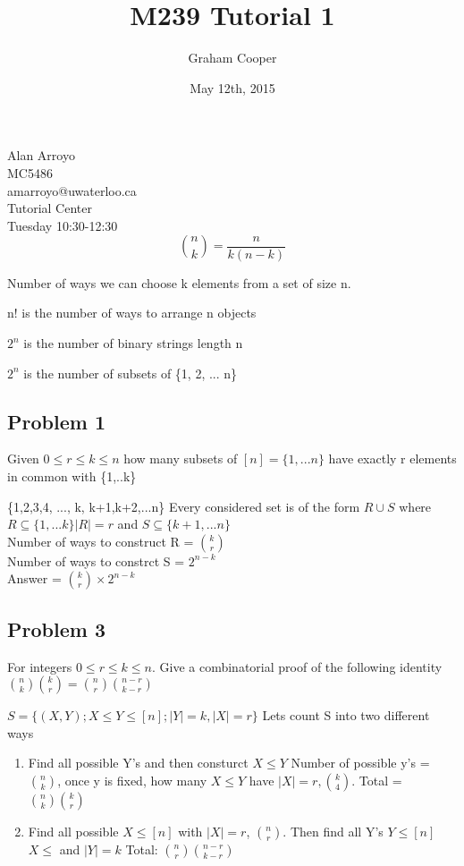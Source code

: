 \documentclass[12pt]{article}
\title{\vspace{-15ex}M239 Tutorial 1\vspace{-1ex}}
\date{May 12th, 2015}
\author{Graham Cooper}
\begin{document}
	\maketitle
	
	Alan Arroyo\\
	MC5486\\
	amarroyo@uwaterloo.ca\\
	Tutorial Center\\
	Tuesday 10:30-12:30\\
	
	$${n \choose k} = \frac{n\!}{k\!(n-k)\!}$$
	
	Number of ways we can choose k elements from a set of size n.
	
	n! is the number of ways to arrange n objects
	
	$2^n$ is the number of binary strings length n
	
	$2^n$ is the number of subsets of \{1, 2, ... n\}
	
	\subsection*{Problem 1}
	Given $0 \leq r \leq k \leq n$ how many subsets of $[n] = \{1,...n\}$ have exactly r elements in common with \{1,..k\}
	
	\{1,2,3,4, ..., k, k+1,k+2,...n\}
	Every considered set is of the form $R \cup S$ where $R \subseteq \{1,...k\} |R| = r$ and $S \subseteq \{k+1, ... n\}$\\
	Number of ways to construct R = ${k \choose r}$\\
	Number of ways to constrct S = $2^{n-k}$\\
	Answer = ${k \choose r} \times 2^{n-k}$\\
	
	\subsection*{Problem 3}
	For integers $0 \leq r \leq k \leq n$. Give a combinatorial proof of the following identity ${n \choose k}{k \choose r} = {n \choose r}{n-r \choose k-r}$
	
	$S = \{(X,Y); X \leq Y \leq [n]; |Y| = k, |X|=r\}$
	Lets count S into two different ways
	\begin{enumerate}
		\item Find all possible Y's and then consturct $X \leq Y$ Number of possible y's = ${n \choose k}$, once y is fixed, how many $X \leq Y$ have $|X| = r, {k \choose 4}$. Total = ${n \choose k}{k \choose r}$
		\item Find all possible $X \leq [n]$ with $|X| = r$, ${n \choose r}$. Then find all Y's $Y \leq [n]$ $X \leq$ and $|Y| = k$ Total: ${n \choose r}{n-r \choose k-r}$
	\end{enumerate}
	
\end{document}
